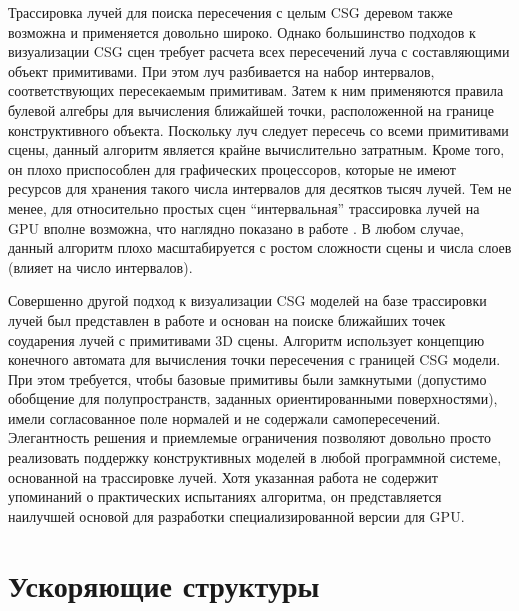 Трассировка лучей для поиска пересечения с целым CSG деревом также возможна и применяется довольно широко. Однако большинство подходов к визуализации CSG сцен требует расчета всех пересечений луча с составляющими объект примитивами. При этом луч разбивается на набор интервалов, соответствующих пересекаемым примитивам. Затем к ним применяются правила булевой алгебры для вычисления ближайшей точки, расположенной на границе конструктивного объекта. Поскольку луч следует пересечь со всеми примитивами сцены, данный алгоритм является крайне вычислительно затратным. Кроме того, он плохо приспособлен для графических процессоров, которые не имеют ресурсов для хранения такого числа интервалов для десятков тысяч лучей. Тем не менее, для относительно простых сцен “интервальная” трассировка лучей на GPU вполне возможна, что наглядно показано в работе \cite{lefebvre2013icesl}. В любом случае, данный алгоритм плохо масштабируется с ростом сложности сцены и числа слоев (влияет на число интервалов).

Совершенно другой подход к визуализации CSG моделей  на базе трассировки лучей был представлен в работе \cite{kensler2006ray} и основан на поиске ближайших точек соударения лучей с  примитивами 3D сцены. Алгоритм использует концепцию конечного автомата для вычисления точки пересечения с границей CSG модели. При этом требуется, чтобы базовые примитивы были замкнутыми (допустимо обобщение для полупространств, заданных ориентированными поверхностями), имели согласованное поле нормалей и не содержали самопересечений. Элегантность решения и приемлемые ограничения позволяют довольно просто реализовать поддержку конструктивных моделей в любой программной системе, основанной на трассировке лучей. Хотя указанная работа не содержит упоминаний о практических испытаниях алгоритма, он представляется наилучшей основой для разработки специализированной версии для GPU.

\section{Ускоряющие структуры} \label{sect_acceleration_structures}

